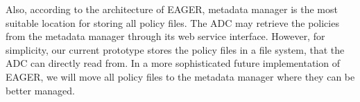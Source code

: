 Also, according to the architecture of EAGER, metadata manager is the most suitable
location for storing all policy files. The ADC may retrieve the policies from the metadata
manager through its web service interface. However, for simplicity, our current prototype stores
the policy files in a file system, that the ADC can directly read from. In a more sophisticated
future implementation of EAGER, we will move all policy files to the metadata manager
where they can be better managed.

